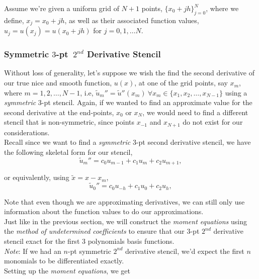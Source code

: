 \documentclass[paper=a4, fontsize=11pt]{scrartcl} %
\numberwithin{equation}{section} %
\numberwithin{figure}{section} %
\numberwithin{table}{section} %
\begin{document}
Assume we're given a uniform grid of $N+1$ points, $\{x_0+ jh\}_{j=0}^{N}$, where we define, $x_j = x_0+jh$, as well as their associated function values, $u_j = u(x_j)=u(x_0+jh)$ for $j=0,1,\ldots N$.\\

\subsubsection{Symmetric $3$-pt\ $2^{nd}$ Derivative Stencil}

Without loss of generality, let's suppose we wish the find the second derivative of our true nice and smooth function, $u(x)$, at one of the grid points, say $x_m$, where $m=1,2,\ldots,N-1$, i.e, $\tilde{u}_m''=\tilde{u}''(x_m)\ \forall x_m\in\{x_1,x_2,\ldots,x_{N-1}\}$ using a \emph{symmetric} $3$-pt stencil. Again, if we wanted to find an approximate value for the second derivative at the end-points, $x_0$ or $x_N$, we would need to find a different stencil that is non-symmetric, since points $x_{-1}$ and $x_{N+1}$ do not exist for our considerations. \\

Recall since we want to find a \emph{symmetric} $3$-pt second derivative stencil, we have the following skeletal form for our stencil,\\

$$\tilde{u}_m'' = c_0 u_{m-1} + c_1 u_m + c_2 u_{m+1},$$

or equivalently, using $\tilde{x} = x - x_m$,\\

$$\tilde{u}_0'' = c_0 u_{-h} + c_1 u_0 + c_2 u_{h},$$

Note that even though we are approximating derivatives, we can still only use information about the function values to do our approximations. \\

Just like in the previous section, we will construct the \emph{moment equations} using the \emph{method of undetermined coefficients} to ensure that our {\bf{$3$}}-pt $2^{nd}$ derivative stencil exact for the first {\bf{$3$}} polynomials basis functions.\\ 

\emph{Note}: If we had an $n$-pt symmetric $2^{nd}$ derivative stencil, we'd expect the first $n$ monomials to be differentiated exactly.\\

Setting up the \emph{moment equations}, we get\\
\end{document}
